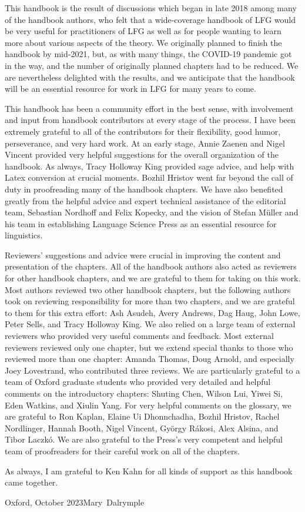 \begin{refsection}

This handbook is the result of discussions which began in late 2018 among many of the handbook authors, who felt that a wide-coverage handbook of LFG would be very useful for practitioners of LFG as well as for people wanting to learn more about various aspects of the theory.  We originally planned to finish the handbook by mid-2021, but, as with many things, the COVID-19 pandemic got in the way, and the number of originally planned chapters had to be reduced. We are nevertheless delighted with the results, and we anticipate that the handbook will be an essential resource for work in LFG for many years to come.

This handbook has been a community effort in the best sense, with involvement and input from handbook contributors at every stage of the process. I have been extremely grateful to all of the contributors for their flexibility, good humor, perseverance, and very hard work.   At an early stage, Annie Zaenen and Nigel Vincent provided very helpful suggestions for the overall organization of the handbook.  As always, Tracy Holloway King provided sage advice, and help with Latex conversion at crucial moments. Bozhil Hristov went far beyond the call of duty in proofreading many of the handbook chapters.  We have also benefited greatly from the helpful advice and expert technical assistance of the editorial team, Sebastian Nordhoff and Felix Kopecky, and the vision of Stefan M\"uller and his team in establishing Language Science Press as an essential resource for linguistics.  
 
Reviewers' suggestions and advice were crucial in improving the content and presentation of the chapters. All of the handbook authors also acted as reviewers for other handbook chapters, and we are grateful to them for taking on this work.  Most authors reviewed two other handbook chapters, but the following authors took on reviewing responsibility for more than two chapters, and we are grateful to them for this extra effort: Ash Asudeh, Avery Andrews, Dag Haug, John Lowe, Peter Sells, and Tracy Holloway King.  We also relied on a large team of external reviewers who provided very useful comments and feedback.  Most external reviewers reviewed only one chapter, but we extend special thanks to those who reviewed more than one chapter: Amanda Thomas, Doug Arnold, and especially Joey Lovestrand, who contributed three reviews.  We are particularly grateful to a team of Oxford graduate students who provided very detailed and helpful comments on the introductory chapters:  Shuting Chen, Wilson Lui, Yiwei Si, Eden Watkins, and Xiulin Yang.  For very helpful comments on the glossary, we are grateful to Ron Kaplan, Elaine Ui Dhonnchadha, Bozhil Hristov, Rachel Nordlinger, Hannah Booth, Nigel Vincent, Gy\"orgy R\'akosi, Alex Alsina, and Tibor Laczk\'o. We are also grateful to the Press's very competent and helpful team of proofreaders for their careful work on all of the chapters. 

As always, I am grateful to Ken Kahn for all kinds of support as this handbook came together.\\\bigskip

Oxford, October 2023\hfill\hbox{Mary Dalrymple}

\end{refsection}


